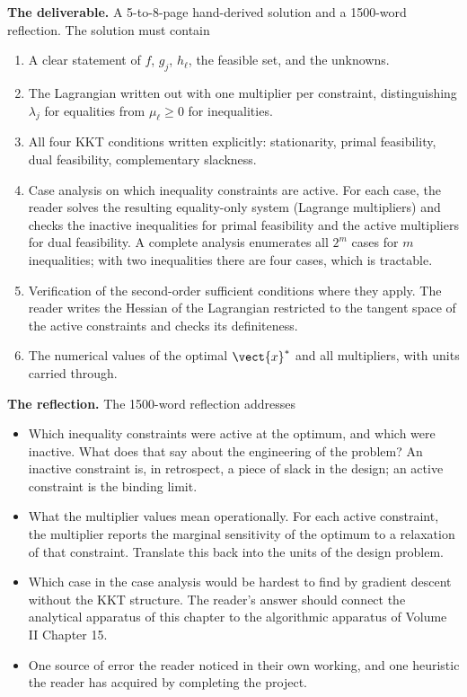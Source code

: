 \begin{project}
\textbf{The deliverable.} A 5-to-8-page hand-derived solution and a
1500-word reflection. The solution must contain
\begin{enumerate}[leftmargin=*]
  \item A clear statement of $f$, $g_{j}$, $h_{\ell}$, the feasible
    set, and the unknowns.
  \item The Lagrangian written out with one multiplier per
    constraint, distinguishing $\lambda_{j}$ for equalities from
    $\mu_{\ell} \geq 0$ for inequalities.
  \item All four KKT conditions written explicitly: stationarity,
    primal feasibility, dual feasibility, complementary slackness.
  \item Case analysis on which inequality constraints are active.
    For each case, the reader solves the resulting equality-only
    system (Lagrange multipliers) and checks the inactive
    inequalities for primal feasibility and the active multipliers
    for dual feasibility. A complete analysis enumerates all
    $2^{m}$ cases for $m$ inequalities; with two inequalities there
    are four cases, which is tractable.
  \item Verification of the second-order sufficient conditions where
    they apply. The reader writes the Hessian of the Lagrangian
    restricted to the tangent space of the active constraints and
    checks its definiteness.
  \item The numerical values of the optimal $\vect{x}^{*}$ and all
    multipliers, with units carried through.
\end{enumerate}

\textbf{The reflection.} The 1500-word reflection addresses
\begin{itemize}[leftmargin=*]
  \item Which inequality constraints were active at the optimum,
    and which were inactive. What does that say about the
    engineering of the problem? An inactive constraint is, in
    retrospect, a piece of slack in the design; an active constraint
    is the binding limit.
  \item What the multiplier values mean operationally. For each
    active constraint, the multiplier reports the marginal
    sensitivity of the optimum to a relaxation of that constraint.
    Translate this back into the units of the design problem.
  \item Which case in the case analysis would be hardest to find
    by gradient descent without the KKT structure. The reader's
    answer should connect the analytical apparatus of this chapter
    to the algorithmic apparatus of Volume II Chapter 15.
  \item One source of error the reader noticed in their own working,
    and one heuristic the reader has acquired by completing the
    project.
\end{itemize}


\end{project}
